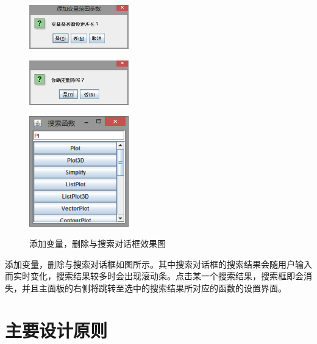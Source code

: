 \documentclass[hyperref, UTF8
,bookmarksnumbered=true, oneside]{ctexbook}
\begin{document}
			\begin{figure}[!h]
				\begin{minipage}[b]{0.3\textwidth}
				\centering
				\includegraphics[width=1.7in]{AddVR.png}
				\label{pic:MathPack}
				\end{minipage}%
				\hspace{0.025\textwidth}%
				\begin{minipage}[b]{0.3\textwidth}
				\centering
				\includegraphics[width=1.7in]{Delete.png}
				\label{pic:GUIPack}
				\end{minipage}			
				\hspace{0.025\textwidth}%
				\begin{minipage}[b]{0.3\textwidth}
				\centering
				\includegraphics[width=1.7in]{Search.png}
				\label{pic:GUIPack}
				\end{minipage}
				\caption{添加变量，删除与搜索对话框效果图}
			\end{figure}

			添加变量，删除与搜索对话框如图所示。其中搜索对话框的搜索结果会随用户输入而实时变化，搜索结果较多时会出现滚动条。点击某一个搜索结果，搜索框即会消失，并且主面板的右侧将跳转至选中的搜索结果所对应的函数的设置界面。
			


	\section{主要设计原则} %
\end{document}
